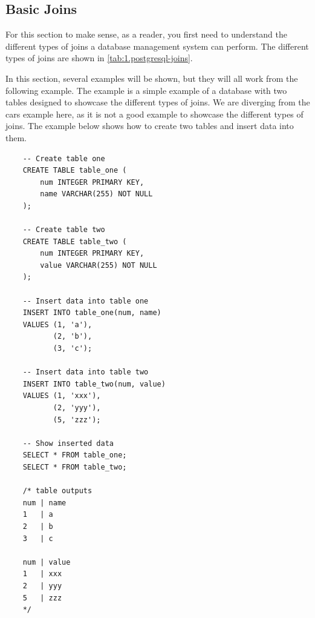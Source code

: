 \subsection{Basic Joins}
For this section to make sense, as a reader, you first need to understand the different types of joins a database management system can perform. The different types of joins are shown in \cref{tab:1.postgresql-joins}.

\begin{table}[htb]
    \centering
    \caption{Commonly used joins in PostgreSQL}
    \label{tab:1.postgresql-joins}
\end{table}

In this section, several examples will be shown, but they will all work from the following example. The example is a simple example of a database with two tables designed to showcase the different types of joins. We are diverging from the cars example here, as it is not a good example to showcase the different types of joins. The example below shows how to create two tables and insert data into them.

\begin{verbatim}
    -- Create table one
    CREATE TABLE table_one (
        num INTEGER PRIMARY KEY,
        name VARCHAR(255) NOT NULL
    );

    -- Create table two
    CREATE TABLE table_two (
        num INTEGER PRIMARY KEY,
        value VARCHAR(255) NOT NULL
    );

    -- Insert data into table one
    INSERT INTO table_one(num, name)
    VALUES (1, 'a'),
           (2, 'b'),
           (3, 'c');

    -- Insert data into table two
    INSERT INTO table_two(num, value)
    VALUES (1, 'xxx'),
           (2, 'yyy'),
           (5, 'zzz');
    
    -- Show inserted data
    SELECT * FROM table_one;
    SELECT * FROM table_two;

    /* table outputs
    num | name
    1   | a
    2   | b
    3   | c
    
    num | value
    1   | xxx
    2   | yyy
    5   | zzz
    */
\end{verbatim}

